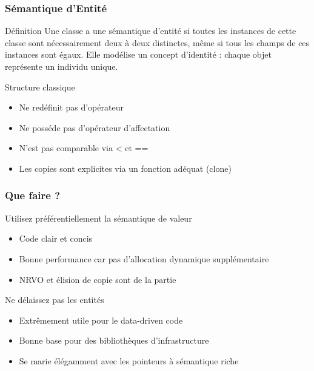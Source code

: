 \documentclass[svgnames]{beamer}
\begin{document}
\frame
{
 \frametitle{Sémantique d'Entité }
  \begin{block}{Définition}
Une classe a une sémantique d'entité si toutes les instances de
cette classe sont nécessairement deux à deux distinctes, même si
tous les champs de ces instances sont égaux. Elle modélise un concept d'identité : chaque objet représente un
individu unique.
  \end{block}

  \begin{block}{Structure classique}
  \begin{itemize}
  \footnotesize
  \item Ne redéfinit pas d'opérateur
  \item Ne posséde pas d'opérateur d'affectation
  \item N'est pas comparable via < et ==
  \item Les copies sont explicites via un fonction adéquat (clone)
  \end{itemize}
  \end{block}
}

\frame
{
 \frametitle{Que faire ?}
  \begin{block}{Utilisez préférentiellement la sémantique de valeur}
  \begin{itemize}
  \footnotesize
  \item Code clair et concis
  \item Bonne performance car pas d'allocation dynamique supplémentaire
  \item NRVO et élision de copie sont de la partie
  \end{itemize}
  \end{block}

  \begin{block}{Ne délaissez pas les entités}
  \begin{itemize}
  \footnotesize
  \item Extrêmement utile pour le data-driven code
  \item Bonne base pour des bibliothèques d'infrastructure
  \item Se marie élégamment avec les pointeurs à sémantique riche
  \end{itemize}
  \end{block}
}
\end{document}
